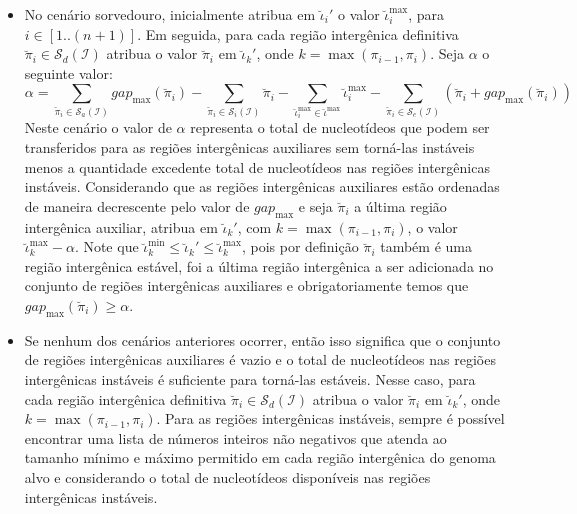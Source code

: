 \begin{itemize}
\begin{itemize}
    \item No cenário sorvedouro, inicialmente atribua em $\breve\iota_{i}'$ o valor $\breve\iota^{\max}_i$, para $i \in [1..({n+1})]$. Em seguida, para cada região intergênica definitiva $\breve\pi_i \in \mathcal{S}_{d}(\mathcal{I})$ atribua o valor $\breve\pi_i$ em $\breve\iota_{k}'$, onde $k = \max(\pi_{i-1},\pi_i)$. Seja $\alpha$ o seguinte valor:
  $$\alpha = \sum_{\breve\pi_i \in \mathcal{S}_{a}(\mathcal{I})} gap_{\max}(\breve\pi_i) - \sum_{\breve\pi_i \in \mathcal{S}_{i}(\mathcal{I})} \breve\pi_i - \sum_{\breve\iota_{i}^{\max}  \in \breve\iota^{\max}} \breve\iota_{i}^{\max} - \sum_{\breve\pi_i \in \mathcal{S}_{e}(\mathcal{I})} (\breve\pi_i + gap_{\max}(\breve\pi_i))$$
    Neste cenário o valor de $\alpha$ representa o total de nucleotídeos que podem ser transferidos para as regiões intergênicas auxiliares sem torná-las instáveis menos a quantidade excedente total de nucleotídeos nas regiões intergênicas instáveis. Considerando que as regiões intergênicas auxiliares estão ordenadas de maneira decrescente pelo valor de $gap_{\max}$ e seja $\breve\pi_i$ a última região intergênica auxiliar, atribua em $\breve\iota_{k}'$, com $k = \max(\pi_{i-1},\pi_i)$, o valor $\breve\iota^{\max}_k - \alpha$. Note que $\breve\iota^{\min}_k \le \breve\iota_{k}' \le \breve\iota^{\max}_k$, pois por definição $\breve\pi_i$ também é uma região intergênica estável, foi a última região intergênica a ser adicionada no conjunto de regiões intergênicas auxiliares e obrigatoriamente temos que $gap_{\max}(\breve\pi_i) \ge \alpha$.

    \item Se nenhum dos cenários anteriores ocorrer, então isso significa que o conjunto de regiões intergênicas auxiliares é vazio e o total de nucleotídeos nas regiões intergênicas instáveis é suficiente para torná-las estáveis. Nesse caso, para cada região intergênica definitiva $\breve\pi_i \in \mathcal{S}_{d}(\mathcal{I})$ atribua o valor $\breve\pi_i$ em $\breve\iota_{k}'$, onde $k = \max(\pi_{i-1},\pi_i)$. Para as regiões intergênicas instáveis, sempre é possível encontrar uma lista de números inteiros não negativos que atenda ao tamanho mínimo e máximo permitido em cada região intergênica do genoma alvo e considerando o total de nucleotídeos disponíveis nas regiões intergênicas instáveis.
  \end{itemize}
\end{itemize}

